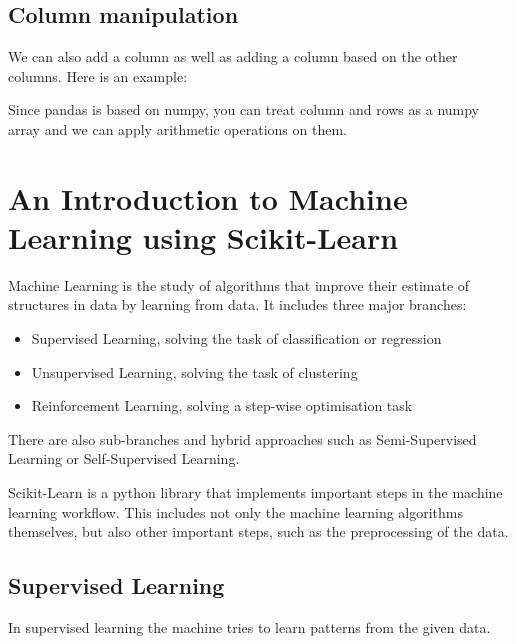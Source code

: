 \documentclass[10pt,a4paper]{article}
\begin{document}
\subsection{Column manipulation}
We can also add a column as well as adding a column based on the other columns. Here is an example:

Since pandas is based on numpy, you can treat column and rows as a numpy array and we can apply arithmetic operations on them.






















\section{An Introduction to Machine Learning using Scikit-Learn}
Machine Learning is the study of algorithms that improve their estimate of structures in data by learning from data. It includes three major branches:
\begin{itemize}
\item Supervised Learning, solving the task of classification or regression
\item Unsupervised Learning, solving the task of clustering
\item Reinforcement Learning, solving a step-wise optimisation task
\end{itemize}
There are also sub-branches and hybrid approaches such as Semi-Supervised Learning or Self-Supervised Learning.

Scikit-Learn is a python library that implements important steps in the machine learning workflow. This includes not only the machine learning algorithms themselves, but also other important steps, such as the preprocessing of the data.



\subsection{Supervised Learning}
In supervised learning the machine tries to learn patterns from the given data.
\end{document}
